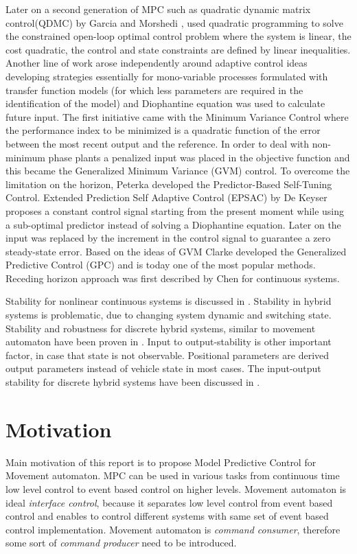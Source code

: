 Later on a second generation of MPC such as quadratic dynamic matrix control(QDMC) by Garcia and Morshedi \cite{garcia1986quadratic}, used quadratic programming to solve the constrained open-loop optimal control problem where the system is linear, the cost quadratic, the control and state constraints are defined by linear inequalities. Another line of work arose independently around adaptive control ideas developing strategies essentially for mono-variable processes formulated with transfer function models (for which less parameters are required in the identification of the model) and Diophantine equation was used to calculate future input. The first initiative came with the Minimum Variance Control where the performance index to be minimized is a quadratic function of the error between the most recent output and the reference. In order to deal with non-minimum phase plants a penalized input was placed in the objective function and this became the Generalized Minimum Variance (GVM) control. To overcome the  limitation on the horizon, Peterka \cite{peterka1984predictor} developed the Predictor-Based Self-Tuning Control. Extended Prediction Self Adaptive Control (EPSAC) by De Keyser \cite{de1985extended} proposes a constant control signal starting from the present moment while using a sub-optimal predictor instead of solving a Diophantine equation. Later on the input was replaced by the increment in the control signal to guarantee a zero steady-state error. Based on the ideas of GVM Clarke \cite{clarke1987generalized} developed the Generalized Predictive Control (GPC) and is today one of the most popular methods.  Receding horizon approach was first described by Chen \cite{chen1982receding} for continuous systems. 

Stability for nonlinear continuous systems is discussed in \cite{chen1998nonlinear}. Stability in hybrid systems is problematic, due to changing system dynamic and switching state. Stability and robustness for discrete hybrid systems, similar to movement automaton have been proven in \cite{lazar2007discrete,lazar2006model}. Input to output-stability is other important factor, in case that state is not observable. Positional parameters are derived output parameters instead of vehicle state in most cases. The input-output stability for discrete hybrid systems have been discussed in \cite{lazar2009predictive}.

\section{Motivation}\noindent
Main motivation of this report is to propose Model Predictive Control for Movement automaton. MPC can be used in various tasks from continuous time low level control to event based control on higher levels. Movement automaton is ideal \textit{interface control}, because it separates low level control from event based control and enables to control different systems with same set of event based control implementation. Movement automaton is \textit{command consumer}, therefore some sort of \textit{command producer} need to be introduced. 

